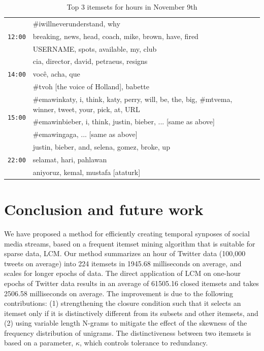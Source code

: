 \documentclass{sig-alternate}
\begin{document}
\begin{table}

\begin{center}
\small
\def\arraystretch{1.1}
\begin{tabular}{|p{.6cm}|p{7.5cm}|}

\hline
\multirow{3}{*}{\texttt{12:00}} 
& \#iwillneverunderstand, why\\\cline{2-2}
& breaking, news, head, coach, mike, brown, have, fired  \\\cline{2-2}
& USERNAME, spots, available, my, club \\\hline
\multirow{3}{*}{\texttt{14:00}} 
& cia, director, david, petraeus, resigns \\\cline{2-2}
& voc\^{e}, acha, que \\\cline{2-2}
& \#tvoh [the voice of Holland], babette \\\hline
\multirow{3}{*}{\texttt{15:00}} & \#emawinkaty, i, think, katy, perry, will, be, the, big,  \#mtvema, winner, tweet, your, pick, at, URL
\\ \cline{2-2}
& \#emawinbieber, i, think, justin, bieber, ... [same as above] \\ \cline{2-2}
& \#emawingaga, ... [same as above]  \\\hline														
\multirow{3}{*}{\texttt{22:00}} & justin, bieber, and, selena, gomez, broke, up
\\ \cline{2-2}
& selamat, hari, pahlawan \\\cline{2-2}
& aniyoruz, kemal, mustafa [ataturk] \\ \hline
\end{tabular}
\end{center}
\caption{Top 3 itemsets for hours in November 9th}
 \label{table:nov9}
\end{table}
 
 

\section{Conclusion and future work}
\label{sec:concfut}
We have proposed a method for efficiently creating temporal synposes of social
media streams, based on a frequent itemset mining algorithm that is suitable
for sparse data, LCM.
Our method summarizes an hour of Twitter data (100,000 tweets on average) into
224 itemsets in 1945.68 milliseconds on average,
and scales for longer epochs of data.
The direct application of LCM on one-hour epochs of Twitter data results in
an average of 61505.16 closed itemsets and takes 2506.58 milliseconds on
average.
The improvement is due to the following contributions: 
(1) strengthening  the closure condition such that it selects an itemset only if
it is distinctively different from its subsets and other itemsets, and 
(2) using variable length N-grams to mitigate the effect
of the skewness of the frequency distribution of unigrams.
The distinctiveness between two itemsets is based on a parameter, $\kappa$, which controls tolerance to redundancy. %
\end{document}
